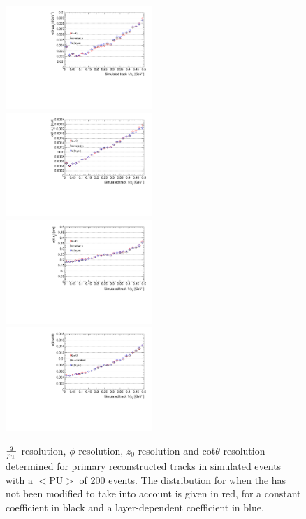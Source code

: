 \begin{figure}[htb]
\centering
\includegraphics[width=0.495\textwidth]{figs/tk-upgrade/results-lowPtTracking/qOverPtResVsInvPtTiltedGeometry_5000.pdf}
\includegraphics[width=0.495\textwidth]{figs/tk-upgrade/results-lowPtTracking/phi0ResVsInvPtTiltedGeometry_5000.pdf}
\\
\includegraphics[width=0.495\textwidth]{figs/tk-upgrade/results-lowPtTracking/z0ResVsInvPtTiltedGeometry_5000.pdf}
\includegraphics[width=0.495\textwidth]{figs/tk-upgrade/results-lowPtTracking/cotThetaResVsInvPtTiltedGeometry_5000.pdf}
\caption{$\frac{q}{p_{\mathrm{T}}}$ resolution, $\phi$ resolution, $z_{0}$ resolution and cot$\theta$ resolution determined for primary reconstructed tracks in simulated \ttbar events with a $<\textrm{PU}>$ of 200 events. The distribution for when the \KF has not been modified to take \MS into account is given in red, for a constant \MS coefficient in black and a layer-dependent \MS coefficient in blue.
}
\label{fig:kfHelixParametersResVsInvPt}
\end{figure}

